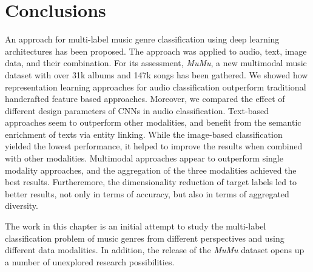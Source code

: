 
\section{Conclusions}\label{sec:multi-class:conclusions}

An approach for multi-label music genre classification using deep learning architectures has been proposed. 
The approach was applied to audio, text, image data, and their combination. 
For its assessment, \emph{MuMu}, a new multimodal music dataset with over 31k albums and 147k songs has been gathered. 
We showed how representation learning approaches for audio classification outperform traditional handcrafted feature based approaches.
Moreover, we compared the effect of different design parameters of CNNs in audio classification. 
Text-based approaches seem to outperform other modalities, and benefit from the semantic enrichment of texts via entity linking. %
While the image-based classification yielded the lowest performance, it helped to improve the results when combined with other modalities.
Multimodal approaches appear to outperform single modality approaches, and the aggregation of the three modalities achieved the best results.
Furtheremore, the dimensionality reduction of target labels led to better results, not only in terms of accuracy, but also in terms of aggregated diversity.

The work in this chapter is an initial attempt to study the multi-label classification problem of music genres from different perspectives and using different data modalities. In addition, the release of the \emph{MuMu} dataset opens up a number of unexplored research possibilities. %